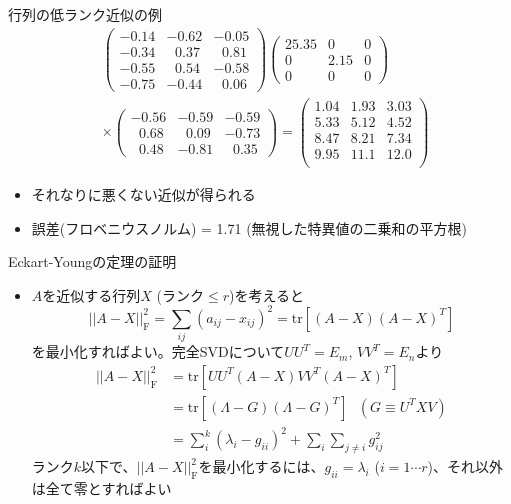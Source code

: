 \begin{frame}[t,fragile]{行列の低ランク近似の例}
  \[
  \begin{split}
    &\begin{pmatrix}
      -0.14 & -0.62 & -0.05 \\
      -0.34 & \ \ \,0.37 & \ \ \,0.81 \\
      -0.55 & \ \ \,0.54 & -0.58 \\
      -0.75 & -0.44 & \ \ \,0.06      
    \end{pmatrix}
    \begin{pmatrix}
      25.35 & 0 & 0 \\
      0 & 2.15 & 0 \\
      0 & 0 & 0
    \end{pmatrix} \\
    & \times
    \begin{pmatrix}
      -0.56 & -0.59 & -0.59 \\
      \ \ \,0.68 & \ \ \,0.09 & -0.73 \\
      \ \ \,0.48 & -0.81 & \ \ \,0.35
    \end{pmatrix}
    = 
    \begin{pmatrix}
      1.04 & 1.93 & 3.03 \\
      5.33 & 5.12 & 4.52 \\
      8.47 & 8.21 & 7.34 \\
      9.95 & 11.1 & 12.0 \\
    \end{pmatrix}
  \end{split}
  \]
  \begin{itemize}
  \item それなりに悪くない近似が得られる
  \item 誤差(フロベニウスノルム) = 1.71 (無視した特異値の二乗和の平方根)
  \end{itemize}
\end{frame}

\begin{frame}[t,fragile]{Eckart-Youngの定理の証明}
  \begin{itemize}
    \setlength{\itemsep}{1em}
  \item $A$を近似する行列$X$ (ランク$\le r$)を考えると
    \[
    ||A-X||_\mathrm{F}^2 = \sum_{ij}(a_{ij}-x_{ij})^2 = \text{tr} [(A-X)(A-X)^T]
    \]
    を最小化すればよい。完全SVDについて$UU^T=E_m$, $VV^T = E_n$より
    \[
    \begin{split}
      ||A-X||_\mathrm{F}^2 &= \text{tr} [UU^T(A-X)VV^T(A-X)^T] \\
      &= \text{tr} [(\Lambda-G)(\Lambda-G)^T]  \ \ \ (G \equiv U^TXV)\\
      &= \sum_i^k (\lambda_i - g_{ii})^2 + \sum_i \sum_{j \ne i} g_{ij}^2
    \end{split}
    \]
    ランク$k$以下で、$||A-X||_\mathrm{F}^2$を最小化するには、$g_{ii}=\lambda_i$ ($i=1 \cdots r$)、それ以外は全て零とすればよい
  \end{itemize}
\end{frame}

